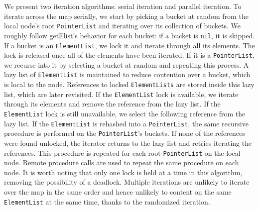 \documentclass[letterpaper, 10 pt, conference]{ieeeconf}  %
\begin{document}
We present two iteration algorithms: serial iteration and parallel iteration. To iterate across the map serially, we start by picking a bucket at random from the local node's root \texttt{PointerList} and iterating over its collection of buckets. We roughly follow getElist's behavior for each bucket: if a bucket is \texttt{nil}, it is skipped. If a bucket is an \texttt{ElementList}, we lock it and iterate through all its elements. The lock is released once all of the elements have been iterated. If it is a \texttt{PointerList}, we recurse into it by selecting a bucket at random and repeating this process. A lazy list of \texttt{ElementList} is maintained to reduce contention over a bucket, which is local to the node. References to locked \texttt{ElementLists} are stored inside this lazy list, which are later revisited. If the \texttt{ElementList} lock is available, we iterate through its elements and remove the reference from the lazy list. If the \texttt{ElementList} lock is still unavailable, we select the following reference from the lazy list. If the \texttt{ElementList} is rehashed into a \texttt{PointerList}, the same recursive procedure is performed on the \texttt{PointerList}'s buckets. If none of the references were found unlocked, the iterator returns to the lazy list and retries iterating the references. This procedure is repeated for each root \texttt{PointerList} on the local node. Remote procedure calls are used to repeat the same procedure on each node. It is worth noting that only one lock is held at a time in this algorithm, removing the possibility of a deadlock. Multiple iterations are unlikely to iterate over the map in the same order and hence unlikely to content on the same \texttt{ElementList} at the same time, thanks to the randomized iteration.
\end{document}

